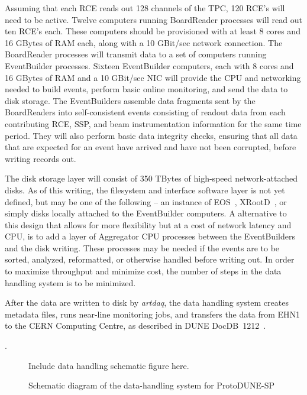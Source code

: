 Assuming that each RCE reads out 128 channels of the TPC, 120 RCE's
will need to be active.  Twelve computers running BoardReader
processes will read out ten RCE's each.  These computers should be
provisioned with at least 8 cores and 16 GBytes of RAM each, along
with a 10 GBit/sec network connection.  The BoardReader processes will
transmit data to a set of computers running EventBuilder processes.
Sixteen EventBuilder computers, each with 8 cores and 16 GBytes of RAM
and a 10 GBit/sec NIC will provide the CPU and networking needed to
build events, perform basic online monitoring, and send the data to
disk storage.  The EventBuilders assemble data fragments sent by the
BoardReaders into self-consistent events consisting of readout data
from each contributing RCE, SSP, and beam instrumentation information
for the same time period.  They will also perform basic data integrity
checks, ensuring that all data that are expected for an event have
arrived and have not been corrupted, before writing records out.

The disk storage layer will consist of 350 TBytes of high-speed
network-attached disks.  As of this writing, the filesystem and
interface software layer is not yet defined, but may be one of the
following -- an instance of EOS~\cite{eos}, XRootD~\cite{xrootd}, or
simply disks locally attached to the EventBuilder computers.  A
alternative to this design that allows for more flexibility but at a
cost of network latency and CPU, is to add a layer of Aggregator CPU
processes between the EventBuilders and the disk writing.  These
processes may be needed if the events are to be sorted, analyzed,
reformatted, or otherwise handled before writing out.  In order to
maximize throughput and minimize cost, the number of steps in the data
handling system is to be minimized.

After the data are written to disk by {\it artdaq}, the data handling
system creates metadata files, runs near-line monitoring jobs, and
transfers the data from EHN1 to the CERN Computing Centre, as
described in DUNE DocDB~1212~\cite{docdb1212}.

.

\begin{figure}[htb]
\centering
Include data handling schematic figure here.
\caption{Schematic diagram of the data-handling system for
  ProtoDUNE-SP~\protect\cite{docdb1212}}
\label{fig:datahandling_schematic}
\end{figure}

